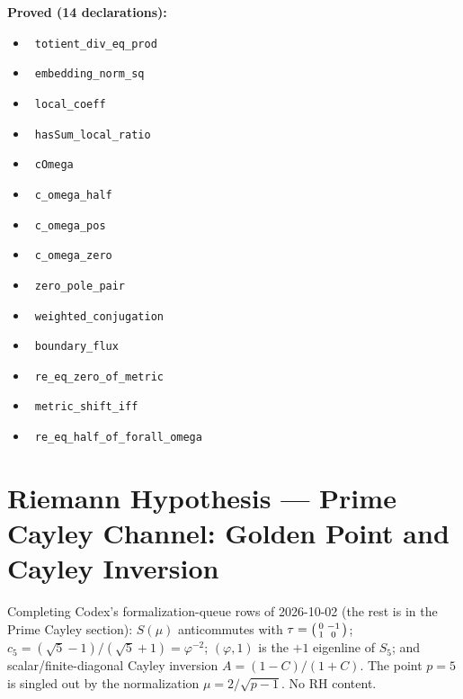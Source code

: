 \documentclass{report}
\theoremstyle{definition}
\begin{document}
\noindent\textbf{Proved (14 declarations):}
\begin{itemize}
  \item {}\leanok\ \texttt{totient\_div\_eq\_prod}
  \item {}\leanok\ \texttt{embedding\_norm\_sq}
  \item {}\leanok\ \texttt{local\_coeff}
  \item {}\leanok\ \texttt{hasSum\_local\_ratio}
  \item {}\leanok\ \texttt{cOmega}
  \item {}\leanok\ \texttt{c\_omega\_half}
  \item {}\leanok\ \texttt{c\_omega\_pos}
  \item {}\leanok\ \texttt{c\_omega\_zero}
  \item {}\leanok\ \texttt{zero\_pole\_pair}
  \item {}\leanok\ \texttt{weighted\_conjugation}
  \item {}\leanok\ \texttt{boundary\_flux}
  \item {}\leanok\ \texttt{re\_eq\_zero\_of\_metric}
  \item {}\leanok\ \texttt{metric\_shift\_iff}
  \item {}\leanok\ \texttt{re\_eq\_half\_of\_forall\_omega}
\end{itemize}

\section{Riemann Hypothesis --- Prime Cayley Channel: Golden Point and Cayley Inversion}
Completing Codex's formalization-queue rows of 2026-10-02 (the rest is in the Prime Cayley section): $S(\mu)$ anticommutes with $\tau=\begin{psmallmatrix}0&-1\\1&0\end{psmallmatrix}$; $c_5=(\sqrt5-1)/(\sqrt5+1)=\varphi^{-2}$; $(\varphi,1)$ is the $+1$ eigenline of $S_5$; and scalar/finite-diagonal Cayley inversion $A=(1-C)/(1+C)$. The point $p=5$ is singled out by the normalization $\mu=2/\sqrt{p-1}$. No RH content.
\end{document}
